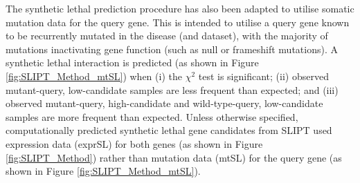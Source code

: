 The synthetic lethal prediction procedure has also been adapted to utilise somatic mutation data for the query gene. This is intended to utilise a query gene known to be recurrently mutated in the disease (and dataset), with the majority of mutations inactivating gene function (such as null or frameshift mutations). A synthetic lethal interaction is predicted  (as shown in Figure \ref{fig:SLIPT_Method_mtSL}) when (i) the $\chi^2$ test is significant; (ii) observed mutant-query, low-candidate samples are less frequent than expected; and (iii) observed mutant-query, high-candidate and wild-type-query, low-candidate samples are more frequent than expected. Unless otherwise specified, computationally predicted synthetic lethal gene candidates from SLIPT used expression data (exprSL) for both genes (as shown in Figure \ref{fig:SLIPT_Method}) rather than mutation data (mtSL) for the query gene (as shown in Figure \ref{fig:SLIPT_Method_mtSL}).

\begin{figure*}[!ht]
\begin{mdframed}
  \begin{center}
  \resizebox{0.8 \textwidth}{!}{
    \fbox{}
   }
   \end{center}
   \caption[Synthetic lethal prediction adapted for mutation]{\small \textbf{Synthetic lethal prediction adapted for mutation.} Synthetic Lethal Interaction Prediction Tool (SLIPT) was also adapted to identify candidate interacting genes using (somatic) mutation data of the query gene in the $\chi^2$ test. Samples are sorted into low, medium, and high expression quantiles for each candidate gene and tested for a directional shift against mutation status of the query gene. A sample having low expression or mutation for the synthetic lethal pair is expected to be unlikely with a corresponding increase in frequency of sample with mutant-high or wild-type-low gene pairs. Synthetic lethal candidate (mtSL) partners of a gene are identified by running this procedure on all possible partner genes, selecting those with an FDR-adjusted $\chi^2$ p-value of $p < 0.05$, and meeting the directional criteria. %
}
\label{fig:SLIPT_Method_mtSL}
\end{mdframed}
\end{figure*}


